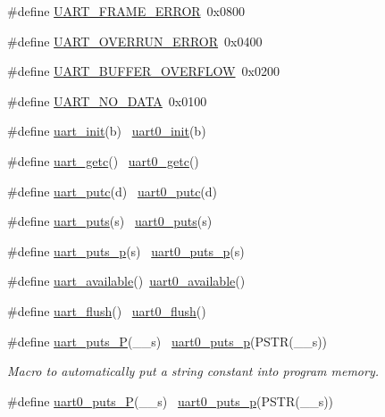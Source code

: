 \begin{DoxyCompactItemize}
\#define \hyperlink{group__avr-uart_gabcdb1041d763560cd8f8e722370dfd37}{U\+A\+R\+T\+\_\+\+F\+R\+A\+M\+E\+\_\+\+E\+R\+R\+O\+R}~0x0800
\item 
\#define \hyperlink{group__avr-uart_ga3183177e3613d8785d8cc8516931beb6}{U\+A\+R\+T\+\_\+\+O\+V\+E\+R\+R\+U\+N\+\_\+\+E\+R\+R\+O\+R}~0x0400
\item 
\#define \hyperlink{group__avr-uart_ga94758f3dad6864703b7417d3e40f11df}{U\+A\+R\+T\+\_\+\+B\+U\+F\+F\+E\+R\+\_\+\+O\+V\+E\+R\+F\+L\+O\+W}~0x0200
\item 
\#define \hyperlink{group__avr-uart_ga77ba544d423ff42d400220a05303f268}{U\+A\+R\+T\+\_\+\+N\+O\+\_\+\+D\+A\+T\+A}~0x0100
\item 
\#define \hyperlink{group__avr-uart_gac57b09cedba351e3a7f318bf42754b2b}{uart\+\_\+init}(b)        ~\hyperlink{group__avr-uart_ga51de0a3b835652d285f354c078669e75}{uart0\+\_\+init}(b)
\item 
\#define \hyperlink{group__avr-uart_ga9002030884b4b63417ade03811a6c599}{uart\+\_\+getc}()          ~\hyperlink{group__avr-uart_ga35407e8f77fa39c1a6b8504707b13dd2}{uart0\+\_\+getc}()
\item 
\#define \hyperlink{group__avr-uart_ga9ea2cac96dccfb809ac3dfc721740ce9}{uart\+\_\+putc}(d)        ~\hyperlink{group__avr-uart_gaf52cb65e977992c01d1f2b7220243f94}{uart0\+\_\+putc}(d)
\item 
\#define \hyperlink{group__avr-uart_gad80ccb7c25bb3a00beeac5061ae88b66}{uart\+\_\+puts}(s)        ~\hyperlink{group__avr-uart_gaeff5f5ff60334be95f0b895f96c10998}{uart0\+\_\+puts}(s)
\item 
\#define \hyperlink{group__avr-uart_gadebe9e3d0f325ed34b3d351078565b67}{uart\+\_\+puts\+\_\+p}(s)    ~\hyperlink{group__avr-uart_gad55b367ecb822ff1c172c78af6013fe5}{uart0\+\_\+puts\+\_\+p}(s)
\item 
\#define \hyperlink{group__avr-uart_gaf84771d5473f9b43dabbefa32917a5aa}{uart\+\_\+available}()~\hyperlink{group__avr-uart_gac369ee64442157556e517078029e9aab}{uart0\+\_\+available}()
\item 
\#define \hyperlink{group__avr-uart_gab04c4a21f4830426faafbcd68adf584d}{uart\+\_\+flush}()        ~\hyperlink{group__avr-uart_gab3e2b412a31f1d05a9a5be70f4b01109}{uart0\+\_\+flush}()
\item 
\#define \hyperlink{group__avr-uart_gab33ef3d9e3ece415aa37e713fe4385b5}{uart\+\_\+puts\+\_\+\+P}(\+\_\+\+\_\+s)          ~\hyperlink{group__avr-uart_gad55b367ecb822ff1c172c78af6013fe5}{uart0\+\_\+puts\+\_\+p}(P\+S\+T\+R(\+\_\+\+\_\+s))
\begin{DoxyCompactList}\small\item\em Macro to automatically put a string constant into program memory. \end{DoxyCompactList}\item 
\#define \hyperlink{group__avr-uart_gaeae7603fe1b81b748384fd38a1430974}{uart0\+\_\+puts\+\_\+\+P}(\+\_\+\+\_\+s)        ~\hyperlink{group__avr-uart_gad55b367ecb822ff1c172c78af6013fe5}{uart0\+\_\+puts\+\_\+p}(P\+S\+T\+R(\+\_\+\+\_\+s))
\end{DoxyCompactItemize}
